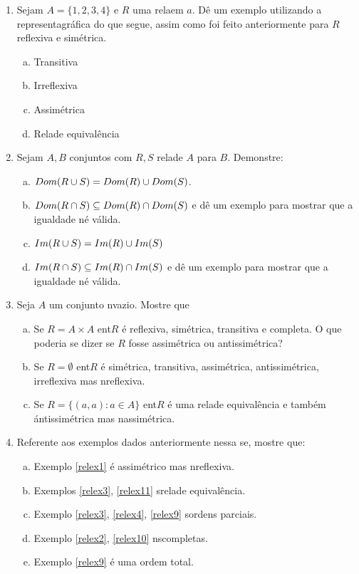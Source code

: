 \begin{enumerate}[{\bf 1.}]
\item Sejam $A=\{1,2,3,4\}$ e $R$ uma rela\cao em $a$. D\^e um exemplo utilizando a representa\cao gr\'afica do que segue, assim como foi feito anteriormente para $R$ reflexiva e sim\'etrica.
\begin{enumerate}[a)]
\item Transitiva
\item Irreflexiva
\item Assim\'etrica
\item Rela\cao de equival\^encia
\end{enumerate}

\item Sejam $A,B$ conjuntos com $R,S$ rela\coes de $A$ para $B$. Demonstre:
\begin{enumerate}[a)]
\item $Dom(R\cup S)=Dom(R)\cup Dom(S)$.
\item $Dom(R\cap S)\subseteq Dom(R)\cap Dom(S)$ e d\^e um exemplo para mostrar que a igualdade n\ao \'e v\'alida.
\item $Im(R\cup S)=Im(R)\cup Im(S)$
\item $Im(R\cap S)\subseteq Im(R)\cap Im(S)$ e d\^e um exemplo para mostrar que a igualdade n\ao \'e v\'alida.
\end{enumerate}

\item Seja $A$ um conjunto n\ao vazio. Mostre que
\begin{enumerate}[a)]
\item Se $R=A\times A$ ent\ao $R$ \'e reflexiva, sim\'etrica, transitiva e completa. O que poderia se dizer se $R$ fosse assim\'etrica ou antissim\'etrica? 
\item Se $R=\emptyset$ ent\ao $R$ \'e sim\'etrica, transitiva, assim\'etrica, antissim\'etrica, irreflexiva mas n\ao reflexiva.
\item Se $R=\{(a,a):a\in A\}$ ent\ao $R$ \'e uma rela\cao de equival\^encia e tamb\'em \' antissim\'etrica mas n\ao assim\'etrica.
\end{enumerate}

\item Referente aos exemplos dados anteriormente nessa se\caoi, mostre que:
\begin{enumerate}[a)]
\item Exemplo \ref{relex1} \'e assim\'etrico mas n\ao reflexiva. 
\item Exemplos \ref{relex3}, \ref{relex11} s\ao rela\coes de equival\^encia.
\item Exemplo \ref{relex3}, \ref{relex4}, \ref{relex9} s\ao ordens parciais.
\item Exemplo \ref{relex2}, \ref{relex10} n\ao s\ao completas.
\item Exemplo \ref{relex9} \'e uma ordem total.
\end{enumerate}


\end{enumerate}
